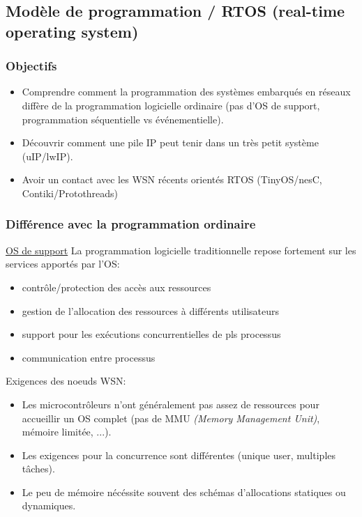 \documentclass{article}
\begin{document}
\begin{sffamily}
\subsection{Modèle de programmation / RTOS (real-time operating system)}
\subsubsection{Objectifs}
\begin{itemize}
\item Comprendre comment la programmation des systèmes embarqués en réseaux
  diffère de la programmation logicielle ordinaire (pas d'OS de support,
  programmation séquentielle vs événementielle).
\item Découvrir comment une pile IP peut tenir dans un très petit système
  (uIP/lwIP).
\item Avoir un contact avec les WSN récents orientés RTOS
  (TinyOS/nesC, Contiki/Protothreads)
\end{itemize}

\subsubsection{Différence avec la programmation ordinaire}
\underline{OS de support}
La programmation logicielle traditionnelle repose fortement sur les services
apportés par l'OS:
\begin{itemize}
\item contrôle/protection des accès aux ressources
\item gestion de l'allocation des ressources à différents utilisateurs
\item support pour les exécutions concurrentielles de pls processus
\item communication entre processus
\end{itemize}

Exigences des noeuds WSN:
\begin{itemize}
\item Les microcontrôleurs n'ont généralement pas assez de ressources pour
  accueillir un OS complet (pas de MMU \textit{(Memory Management Unit)}, mémoire limitée, ...).
\item Les exigences pour la concurrence sont différentes (unique user,
  multiples tâches).
\item Le peu de mémoire nécéssite souvent des schémas d'allocations statiques
  ou dynamiques.
\end{itemize}


\end{sffamily}
\end{document}
